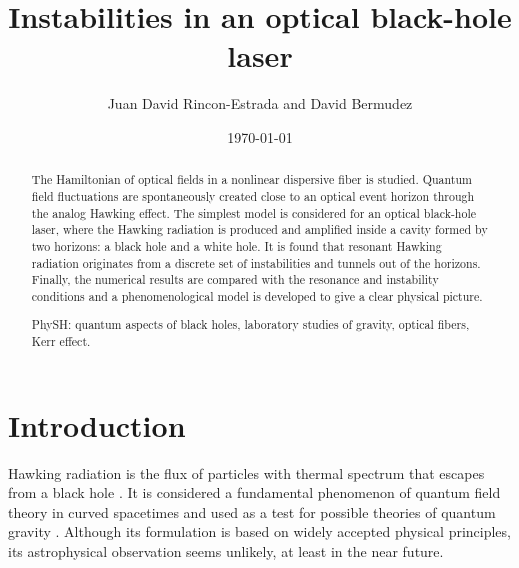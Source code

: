 \documentclass[aps,pra,reprint,amsmath,amssymb,showpacs,groupedaddress,floatfix]{revtex4-1}
\begin{document}

\title{Instabilities in an optical black-hole laser}
\author{Juan David Rincon-Estrada and David Bermudez}

\date{\today}

\begin{abstract}
The Hamiltonian of optical fields in a nonlinear dispersive fiber is studied. Quantum field fluctuations are spontaneously created close to an optical event horizon through the analog Hawking effect. The simplest model is considered for an optical black-hole laser, where the Hawking radiation is produced and amplified inside a cavity formed by two horizons: a black hole and a white hole. It is found that resonant Hawking radiation originates from a discrete set of instabilities and tunnels out of the horizons. Finally, the numerical results are compared with the resonance and instability conditions and a phenomenological model is developed to give a clear physical picture.

PhySH: quantum aspects of black holes, laboratory studies of gravity, optical fibers, Kerr effect.
\end{abstract}

\maketitle

\section{Introduction}\label{intro}
Hawking radiation is the flux of particles with thermal spectrum that escapes from a black hole \cite{Hawking1974}. It is considered a fundamental phenomenon of quantum field theory in curved spacetimes and used as a test for possible theories of quantum gravity \cite{Helfer2003,Visser2003}. Although its formulation is based on widely accepted physical principles, its astrophysical observation seems unlikely, at least in the near future.
\end{document}

